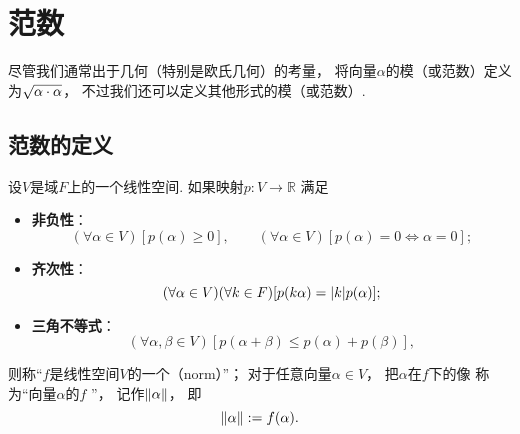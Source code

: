 \section{范数}
尽管我们通常出于几何（特别是欧氏几何）的考量，
将向量\(\alpha\)的模（或范数）定义为\(\sqrt{\alpha\cdot\alpha}\)，
不过我们还可以定义其他形式的模（或范数）.

\subsection{范数的定义}
\begin{definition}
设\(V\)是域\(F\)上的一个线性空间.
如果映射\(p\colon V \to \mathbb{R}\)
满足\begin{itemize}
	\item {\rm\bf 非负性}：\begin{equation*}
		(\forall \alpha \in V)
		[p(\alpha) \geq 0],
		\qquad
		(\forall \alpha \in V)
		[
			p(\alpha) = 0
			\iff
			\alpha = 0
		];
	\end{equation*}

	\item {\rm\bf 齐次性}：\begin{equation*}
		(\forall \alpha \in V)
		(\forall k \in F)
		[
			p(k \alpha) = \abs{k} p(\alpha)
		];
	\end{equation*}

	\item {\rm\bf 三角不等式}：\begin{equation*}
		(\forall \alpha,\beta \in V)
		[
			p(\alpha+\beta) \leq p(\alpha) + p(\beta)
		],
	\end{equation*}
\end{itemize}
则称“\(f\)是线性空间\(V\)的一个（norm）”；
对于任意向量\(\alpha \in V\)，
把\(\alpha\)在\(f\)下的像
称为“向量\(\alpha\)的\(f\) ”，
记作\(\norm{\alpha}\)，
即\begin{equation*}
	\norm{\alpha}
	:=
	f(\alpha).
\end{equation*}
\end{definition}

